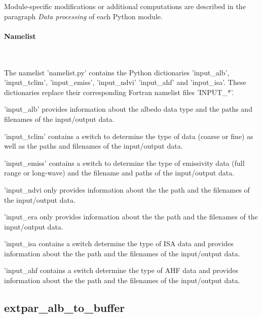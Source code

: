 \documentclass[a4paper,10pt,DIV14,BCOR1cm,titlepage,twoside]{scrartcl}
\begin{document}
\noindent Module-specific modifications or additional computations are described in the paragraph \textit{Data processing} of each Python module.
\paragraph{Namelist}\ \par\medskip\noindent
\noindent The namelist 'namelist.py' contains the Python dictionaries 'input\_alb', 'input\_tclim', 'input\_emiss', 'input\_ndvi' 'input\_ahf' and 'input\_isa'. These dictionaries replace their corresponding Fortran namelist files 'INPUT\_*'.

\noindent 'input\_alb' provides information about the albedo data type and the paths and filenames of the input/output data.

\noindent'input\_tclim' contains a switch to determine the type of data (coarse or fine) as well as the paths and filenames of the input/output data.

\noindent'input\_emiss' contains a switch to determine the type of emissivity data (full range or long-wave) and the filename and paths of the input/output data.

\noindent'input\_ndvi only provides information about the the path and the filenames of the input/output data.

\noindent'input\_era only provides information about the the path and the filenames of the input/output data.

\noindent'input\_isa contains a switch determine the type of ISA data and  provides information about the the path and the filenames of the input/output data.

\noindent'input\_ahf contains a switch determine the type of AHF data and  provides information about the the path and the filenames of the input/output data.

\subsection{extpar\_alb\_to\_buffer}\label{extpar_alb_to_buffer}
\end{document}
